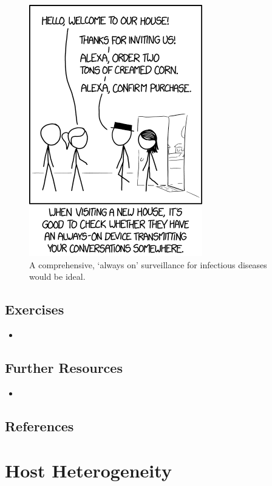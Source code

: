 \documentclass[]{book}
\theoremstyle{definition}
\theoremstyle{definition}
\theoremstyle{definition}
\theoremstyle{remark}
\begin{document}
\begin{figure}
\centering
\includegraphics{./images/xkcd-listening.png}
\caption{A comprehensive, `always on' surveillance for infectious
diseases would be ideal.}
\end{figure}

\section{Exercises}\label{exercises-9}

\begin{itemize}
\item
\end{itemize}

\section{Further Resources}\label{further-resources-9}

\begin{itemize}
\item
\end{itemize}

\section{References}\label{references-10}

\chapter{Host Heterogeneity}\label{host-heterogeneity}
\end{document}
